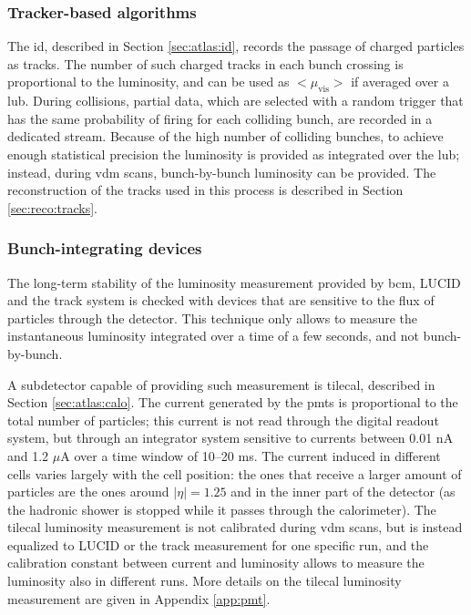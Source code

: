 
\subsubsection*{Tracker-based algorithms}

The \gls{id}, described in Section \ref{sec:atlas:id}, records the passage of charged particles as tracks. The number of such charged tracks in each bunch crossing is proportional to the luminosity, and can be used as ${<}\mu_\mathrm{vis}{>}$ if averaged over a \gls{lub}. 
During collisions, partial data, which are selected with a random trigger that has the same probability of firing for each colliding bunch, 
are recorded in a dedicated stream. Because of the high number of colliding bunches, to achieve enough statistical precision the luminosity is provided as integrated over the \gls{lub}; instead, during \gls{vdm} scans, bunch-by-bunch luminosity can be provided. 
The reconstruction of the tracks used in this process is described in Section \ref{sec:reco:tracks}.

\subsubsection*{Bunch-integrating devices}

The long-term stability of the luminosity measurement provided by \gls{bcm}, LUCID and the track system is checked with devices that are sensitive to the flux of particles through the detector. This technique only allows to measure the instantaneous luminosity integrated over a time of a few seconds, and not bunch-by-bunch.

A subdetector capable of providing such measurement is \gls{tilecal}, described in Section \ref{sec:atlas:calo}. The current generated by the \glspl{pmt} is proportional to the total number of particles; this current is not read through the digital readout system, but through an integrator system sensitive to currents between 0.01 nA and 1.2 $\mu$A over a time window of 10--20 ms. The current induced in different cells varies largely with the cell position: the ones that receive a larger amount of particles are the ones around $|\eta|=1.25$ and in the inner part of the detector (as the hadronic shower is stopped while it passes through the calorimeter). The \gls{tilecal} luminosity measurement is not calibrated during \gls{vdm} scans, but is instead equalized to LUCID or the track measurement for one specific run, and the calibration constant between current and luminosity allows to measure the luminosity also in different runs. More details on the \gls{tilecal} luminosity measurement are given in 
Appendix \ref{app:pmt}. 

